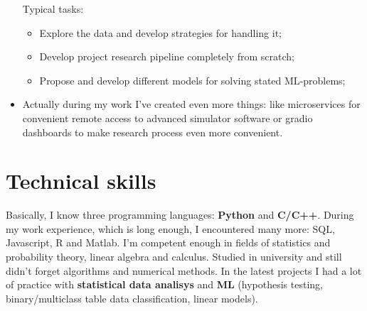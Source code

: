 \documentclass[12pt,a4paper,roman]{moderncv}
\begin{document}
\begin{itemize}
Typical tasks: 
 \begin{itemize}
  \item Explore the data and develop strategies for handling it;
  \item Develop project research pipeline completely from scratch;
  \item Propose and develop different models for solving stated ML-problems; \newline
 \end{itemize}
\item Actually during my work I've created even more things: like microservices for convenient remote access to advanced simulator software
or gradio dashboards to make research process even more convenient. \newline
\end{itemize}
\section{Technical skills}
\hspace{10mm}Basically, I know three programming languages: \textbf{Python} and \textbf{C/C++}.
During my work experience, which is long enough, I encountered many more: SQL, Javascript, R and Matlab. \newline
I'm competent enough in fields of statistics and probability theory, linear algebra and calculus.
Studied in university and still didn't forget algorithms and numerical methods. \newline
In the latest projects I had a lot of practice with \textbf{statistical data analisys} and \textbf{ML} (hypothesis testing, 
binary/multiclass table data classification, linear models). \newline
\end{document}
